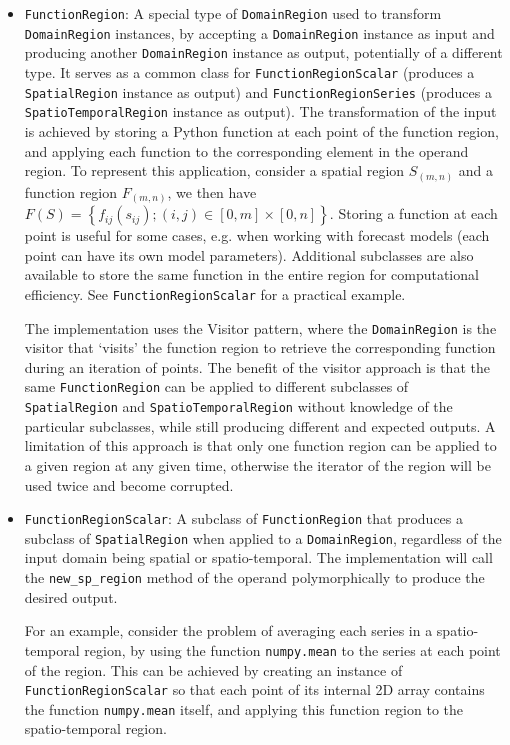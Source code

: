 \begin{itemize}
	\item \texttt{FunctionRegion}: A special type of \texttt{DomainRegion} used to transform \texttt{DomainRegion} instances, by accepting a \texttt{DomainRegion} instance as input and producing another \texttt{DomainRegion} instance as output, potentially of a different type. It serves as a common class for \texttt{FunctionRegionScalar} (produces a \texttt{SpatialRegion} instance as output) and \texttt{FunctionRegionSeries} (produces a \texttt{SpatioTemporalRegion} instance as output). The transformation of the input is achieved by storing a Python function at each point of the function region, and applying each function to the corresponding element in the operand region. To represent this application, consider a spatial region $S_{(m,n)}$ and a function region $F_{(m,n)}$, we then have $F(S) = \left\{ f_{ij}(s_{ij}); (i, j) \in [0, m]\times[0, n] \right\}$. Storing a function at each point is useful for some cases, e.g. when working with forecast models (each point can have its own model parameters). Additional subclasses are also available to store the same function in the entire region for computational efficiency. See \texttt{FunctionRegionScalar} for a practical example.
	
	The implementation uses the Visitor pattern, where the \texttt{DomainRegion} is the visitor that `visits' the function region to retrieve the corresponding function during an iteration of points. The benefit of the visitor approach is that the same \texttt{FunctionRegion} can be applied to different subclasses of \texttt{SpatialRegion} and \texttt{SpatioTemporalRegion} without knowledge of the particular subclasses, while still producing different and expected outputs. A limitation of this approach is that only one function region can be applied to a given region at any given time, otherwise the iterator of the region will be used twice and become corrupted.
	
	\item \texttt{FunctionRegionScalar}: A subclass of \texttt{FunctionRegion} that produces a subclass of \texttt{SpatialRegion} when applied to a \texttt{DomainRegion}, regardless of the input domain being spatial or spatio-temporal. The implementation will call the \texttt{new\_sp\_region} method of the operand polymorphically to produce the desired output.
	
	For an example, consider the problem of averaging each series in a spatio-temporal region, by using the function \texttt{numpy.mean} to the series at each point of the region. This can be achieved by creating an instance of \texttt{FunctionRegionScalar} so that each point of its internal 2D array contains the function \texttt{numpy.mean} itself, and applying this function region to the spatio-temporal region. 
	

\end{itemize}
